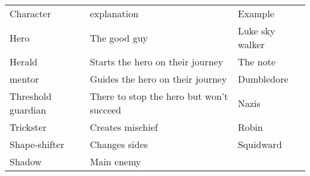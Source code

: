 \noindent\begin{tabularx}{\linewidth}{XXX}
  Character & explanation & Example \\  
  Hero & The good guy & Luke sky walker \\
  Herald & Starts the hero on their journey & The note \\
  mentor & Guides the hero on their journey & Dumbledore \\
  Threshold guardian & There to stop the hero but won’t succeed & Nazis \\
  Trickster &  Creates mischief & Robin \\
  Shape-shifter &  Changes sides & Squidward \\
  Shadow & Main enemy & \\
\end{tabularx}

